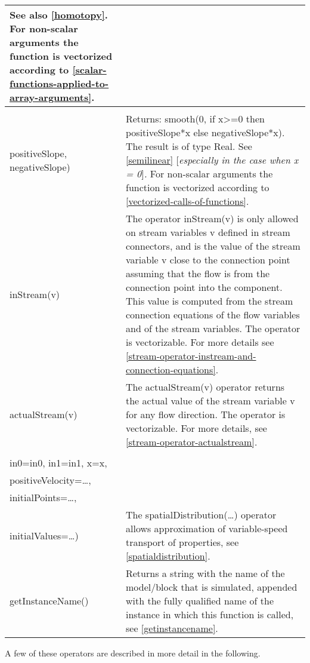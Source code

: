 \begin{longtable}{|p{5.1cm}|p{8cm}|}
See also \autoref{homotopy}. For non-scalar arguments the function is
vectorized according to \autoref{scalar-functions-applied-to-array-arguments}.\\ \hline
\begin{tabular}{@{}p{5.1cm}@{}}
semiLinear(x,\\
positiveSlope,
negativeSlope) 
\end{tabular}& 
Returns:
smooth(0, if x\textgreater{}=0 then positiveSlope*x else
negativeSlope*x).
The result is of type Real. See \autoref{semilinear} {[}\emph{especially in
the case when x = 0}{]}\emph{.} For non-scalar arguments the function is
vectorized according to \autoref{vectorized-calls-of-functions}.\\ \hline
inStream(v) & The operator inStream(v) is only allowed on stream
variables v defined in stream connectors, and is the value of the stream
variable v close to the connection point assuming that the flow is from
the connection point into the component. This value is computed from the
stream connection equations of the flow variables and of the stream
variables. The operator is vectorizable. For more details see \autoref{stream-operator-instream-and-connection-equations}.\\ \hline
actualStream(v) & The actualStream(v) operator returns the actual value
of the stream variable v for any flow direction. The operator is
vectorizable. For more details, see \autoref{stream-operator-actualstream}.\\ \hline
\begin{tabular}{@{}p{5.1cm}@{}}
spatialDistribution(\\
in0=in0, in1=in1, x=x,\\
positiveVelocity=\ldots{},\\
initialPoints=\ldots{},\\
initialValues=\ldots{})
\end{tabular} & 
The spatialDistribution(\ldots{}) operator allows approximation of
variable-speed transport of properties, see \autoref{spatialdistribution}.\\ \hline
getInstanceName() & Returns a string with the name of the model/block
that is simulated, appended with the fully qualified name of the
instance in which this function is called, see \autoref{getinstancename}.\\ \hline
\end{longtable}

A few of these operators are described in more detail in the following.

